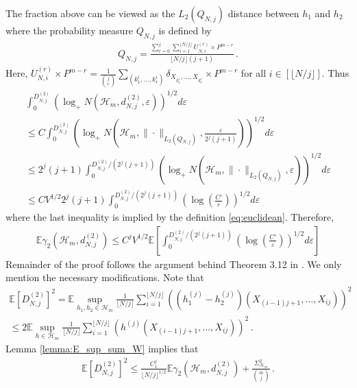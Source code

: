 \documentclass[12pt]{article}
\def\l{\left}
\def\r{\right}
\newcommand{\m}{\mathcal}
\newcommand{\mb}{\mathbb}
\theoremstyle{thmstyletwo}%
\theoremstyle{thmstylethree}%
\begin{document}
The fraction above can be viewed as the $L_2(Q_{N,j})$ distance between $h_1$ and $h_2$ where
the probability measure $Q_{N,j}$ is defined by
\begin{align*}
    Q_{N,j} = \frac{\sum_{r=0}^j \sum_{i=1}^{\lfloor N/j \rfloor} U_{N,i}^{(r)} \times P^{m-r}}{\lfloor N/j \rfloor (j+1) }\,.
\end{align*}
Here, $U_{N, i}^{(r)} \times P^{m-r} = \frac{1}{{j \choose r}} \sum_{(k^i_1, \ldots, k^i_r)} \delta_{X_{k^i_1}, \ldots, X_{k^i_r}} \times P^{m-r}$ for all $i \in \l[\lfloor N/j \rfloor\r]$. Thus
\begin{multline*}
    \int_0^{D^{(2)}_{N,j}} \l(\log_+ N(\mathcal{H}_m, d^{(2)}_{N,j}, \varepsilon) \r)^{1/2} d\varepsilon \\
    \leq C \int_0^{D^{(2)}_{N,j}} \l(\log_+ N \l(\mathcal{H}_m, \|\cdot\|_{L_2(Q_{N,j})}, \frac{\varepsilon}{2^j(j+1)} \r) \r)^{1/2} d\varepsilon  \\
    \leq 2^j(j+1)  \int_0^{D^{(2)}_{N,j}/(2^j(j+1))} \l(\log_+ N \l(\mathcal{H}_m, \|\cdot\|_{L_2(Q_{N,j})}, \varepsilon  \r) \r)^{1/2} d\varepsilon \\
    \leq CV^{1/2}2^j(j+1) \int _0^{D^{(2)}_{N,j}/(2^j(j+1))} \l(\log \l(\frac{C'}{\varepsilon}\r)\r)^{1/2} d\varepsilon
\end{multline*}
where the last inequality is implied by the definition \eqref{eq:euclidean}. 
Therefore,
\begin{align*}
    \mb E \gamma_2(\mathcal{H}_m, d^{(2)}_{N,j}) \leq C^{j}V^{1/2} \mb E \l[\int _0^{ D^{(2)}_{N,j}/(2^j(j+1))} \l(\log \l(\frac{C'}{\varepsilon}\r)\r)^{1/2} d\varepsilon \r]
\end{align*}
Remainder of the proof follows the argument behind Theorem 3.12 in \cite{koltchinskii2011oracle}. We only mention the necessary modifications. 
Note that
\begin{multline*}
    \mb E \l[D_{N,j}^{(2)}\r]^2 = \mb E \sup_{h_1, h_2 \in \mathcal{H}_m}  \frac{1}{\lfloor N/j \rfloor} \sum_{i=1}^{\lfloor N/j \rfloor} \l(\l(h_1^{(j)} - h_2^{(j)}\r)\l(X_{(i-1)j + 1}, \ldots,X_{ij}\r)\r)^2 \\
    \leq 2 \mb E \sup_{h \in \mathcal{H}_m}  \frac{1}{\lfloor N/j \rfloor} \sum_{i=1}^{\lfloor N/j \rfloor} \l(h^{(j)}\l(X_{(i-1)j + 1}, \ldots,X_{ij}\r)\r)^2\,.
\end{multline*}
Lemma \ref{lemma:E_sup_sum_W} implies that
\begin{align*}
    \mb E \l[D_{N,j}^{(2)}\r]^2 \leq  \frac{C_1^{j}}{\lfloor N/j \rfloor^{1/2}} \mb E \gamma_2 (\mathcal{H}_m, d^{(2)}_{N,j}) + \frac{\Sigma_{\m H_m}^2}{{m \choose j}}\,.
\end{align*}
\end{document}
